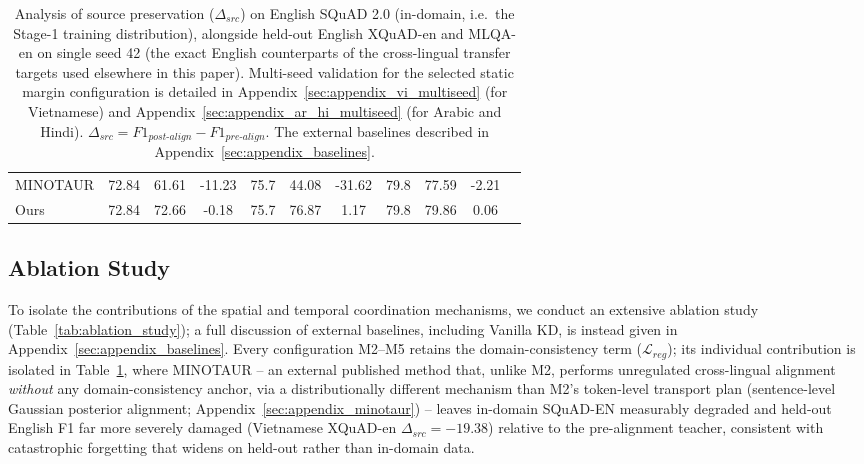 \documentclass[11pt]{article}
\begin{document}
\begin{table}[t]
{\begin{tabular}{lcccccccccc}
MINOTAUR & 72.84 & 61.61 & -11.23 & 75.7 & 44.08 & -31.62 & 79.8 & 77.59 & -2.21 \\
Ours & 72.84 & 72.66 & -0.18 & 75.7 & 76.87 & 1.17 & 79.8 & 79.86 & 0.06 \\
\bottomrule
\end{tabular}
}
\caption{Analysis of source preservation ($\Delta_{src}$) on English SQuAD 2.0 (in-domain, i.e.\ the Stage-1 training distribution), alongside held-out English XQuAD-en and MLQA-en on single seed 42 (the exact English counterparts of the cross-lingual transfer targets used elsewhere in this paper). Multi-seed validation for the selected static margin configuration is detailed in Appendix~\ref{sec:appendix_vi_multiseed} (for Vietnamese) and Appendix~\ref{sec:appendix_ar_hi_multiseed} (for Arabic and Hindi). $\Delta_{src} = F1_{post\text{-}align} - F1_{pre\text{-}align}$. The external baselines described in Appendix~\ref{sec:appendix_baselines}.}
\label{tab:source_preservation}
\end{table}

\subsection{Ablation Study}
\label{sec:ablation_study}
To isolate the contributions of the spatial and temporal coordination mechanisms, we conduct an extensive ablation study (Table~\ref{tab:ablation_study}); a full discussion of external baselines, including Vanilla KD, is instead given in Appendix~\ref{sec:appendix_baselines}. Every configuration M2--M5 retains the domain-consistency term ($\mathcal{L}_{reg}$); its individual contribution is isolated in Table~\ref{tab:source_preservation}, where MINOTAUR -- an external published method that, unlike M2, performs unregulated cross-lingual alignment \emph{without} any domain-consistency anchor, via a distributionally different mechanism than M2's token-level transport plan (sentence-level Gaussian posterior alignment; Appendix~\ref{sec:appendix_minotaur}) -- leaves in-domain SQuAD-EN measurably degraded and held-out English F1 far more severely damaged (Vietnamese XQuAD-en $\Delta_{src}=-19.38$) relative to the pre-alignment teacher, consistent with catastrophic forgetting that widens on held-out rather than in-domain data.
\end{document}
